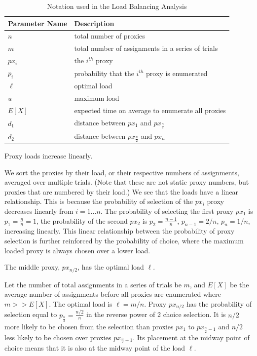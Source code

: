 \begin{table}[h]
  \centering
	\begin{tabular}{ll}
	\hline
	\cline{1-2}
	Parameter Name    & Description  \\
	\hline
    $n$     & total number of proxies \\
    $m$     & total number of assignments in a series of trials \\
    $px_i$  & the $i^{th}$ proxy \\
    $p_i$   & probability that the $i^{th}$ proxy is enumerated \\
	$\ell$     & optimal load \\
	$u$     & maximum load \\
    $E[X]$  & expected time on average to enumerate all proxies \\
    $d_1$ & distance between $px_1$ and $px_{\frac{n}{2}}$ \\
    $d_2$ & distance between $px_{\frac{n}{2}}$ and $px_n$ \\
	\hline
	\end{tabular}
  \caption{Notation used in the Load Balancing Analysis}
  \label{tab:vars}
\end{table}

\begin{lemma}{Proxy loads increase linearly.}

We sort the proxies by their load, or their respective numbers of assignments, averaged over multiple trials. (Note that these are not static proxy numbers, but proxies that are numbered by their load.) We see that the loads have a linear relationship. This is because the probability of selection of the $px_i$ proxy decreases linearly from $i=1...n$. The probability of selecting the first proxy $px_1$ is $p_1=\frac{n}{n}=1$, the probability of the second $px_2$ is $p_2=\frac{n-1}{n}$, $p_{n-1}=2/n$, $p_{n}=1/n$, increasing linearly. This linear relationship between the probability of proxy selection is further reinforced by the probability of choice, where the maximum loaded proxy is always chosen over a lower load.
\end{lemma}

\begin{lemma}{The middle proxy, $px_{n/2}$, has the optimal load $\ell$.}

Let the number of total assignments in a series of trials be $m$, and $E[X]$ be the average number of assignments before all proxies are enumerated where $m>>E[X]$. The optimal load is $\ell=m/n$. Proxy $px_{n/2}$ has the probability of selection equal to $p_{\frac{n}{2}}=\frac{n/2}{n}$ in the reverse power of 2 choice selection. It is $n/2$ more likely to be chosen from the selection than proxies $px_1$ to $px_{\frac{n}{2} - 1}$ and $n/2$ less likely to be chosen over proxies $px_{\frac{n}{2} + 1}$. Its placement at the midway point of choice means that it is also at the midway point of the load $\ell$. 
\end{lemma}

